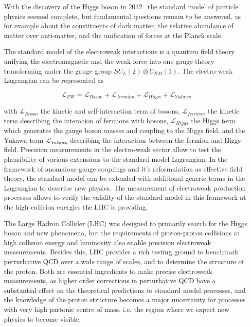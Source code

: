 \label{ss-intro-motivation}

With the discovery of the Higgs boson in 2012~\cite{Chatrchyan201230, Aad20121} 
the standard model of particle physics
seemed complete, but fundamental questions remain to be answered, as for example about the
constituents of dark matter, the relative abundance of matter over anti-matter, 
and the unification of forces at the Planck scale. 

The standard model of the electroweak interactions is a quantum field theory
unifying the electromagnetic and the weak force into one gauge theory transforming
under the gauge group $SU_L(2) \otimes U_{EM}(1)$. 
The electro-weak Lagrangian can be represented as 

$$ \mathcal{L}_{EW} = \mathcal{L}_{Boson} + \mathcal{L}_{fermion} + \mathcal{L}_{Higgs} + \mathcal{L}_{Yukawa} $$

with $\mathcal{L}_{Boson}$ the kinetic and self-interaction term of bosons,
$\mathcal{L}_{fermion}$ the kinetic term describing the interacion of fermions
with bosons, $\mathcal{L}_{Higgs}$ the Higgs term which generates the gauge boson masses
and coupling to the Higgs field, and the Yukawa term $\mathcal{L}_{Yukawa}$ describing
the interaction between the fermion and Higgs field. 
Precision measurements in the electro-weak sector allow to test the plausibility of 
various extensions to the standard model Lagrangian. In the framework of anomalous gauge couplings
and it's reformulation as effective field theory, the standard model can be extended
with additional generic terms in the Lagrangian to describe new physics. The 
measurement of electroweak production processes allows to verify the validity 
of the standard model in this framework at the high collision energies the LHC
is providing.

The Large Hadron Collider (LHC) was designed to primarily search for the Higgs boson and
new phenomena, but the requirements of proton-proton collisions at high collision energy and 
luminosity also enable precision electroweak measurements. Besides this, LHC 
provides a rich testing ground to benchmark perturbative QCD over a wide range of scales, 
and to determine the structure of the proton. 
Both are essential ingredients to make precise electroweak measurements, as higher order
corrections in perturbative QCD have a substantial effect on the theoretical predictions to 
standard model processes, and the knowledge of the proton structure becomes a major uncertainty
for processes with very high partonic centre of mass, i.e. the region where we expect new physics
to become visible.

